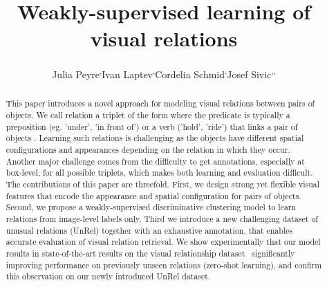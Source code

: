 \documentclass[10pt,twocolumn,letterpaper]{article}
\begin{document}
\title{Weakly-supervised learning of visual relations}

\author{Julia Peyre\footnotemark[1] \textsuperscript{,}\footnotemark[2]
 \qquad Ivan Laptev\footnotemark[1] \textsuperscript{,}\footnotemark[2] \qquad Cordelia Schmid\footnotemark[2] \textsuperscript{,}\footnotemark[4] \qquad Josef Sivic\footnotemark[1] \textsuperscript{,}\footnotemark[2] \textsuperscript{,}\footnotemark[3] \\
}


\maketitle



\begin{abstract}

This paper introduces a novel approach for modeling visual relations
        between pairs of objects.
 We call relation a triplet of the form  where the predicate is typically a
        preposition (eg. 'under', 'in front of') or a verb ('hold',
        'ride') that links a pair of objects . Learning such relations is challenging as the
        objects have different spatial configurations and appearances
        depending on the relation in which they occur. Another major
        challenge comes from the difficulty to get annotations,
        especially at box-level, for all possible triplets, which
        makes both learning and evaluation difficult. The
        contributions of this paper are threefold. First, we design strong yet flexible visual features that 		encode the appearance and spatial configuration for pairs of objects. Second, we propose a
        weakly-supervised discriminative clustering model to learn
        relations from image-level labels only. Third we introduce a
        new challenging dataset of unusual relations (UnRel) together
        with an exhaustive annotation, that enables accurate
        evaluation of visual relation retrieval. We show
        experimentally that our model results in state-of-the-art
        results on the visual relationship dataset~\cite{Lu16}
        significantly improving performance on previously
        unseen relations (zero-shot learning), and confirm this
        observation on our newly introduced UnRel dataset.    


\end{abstract}
\end{document}
